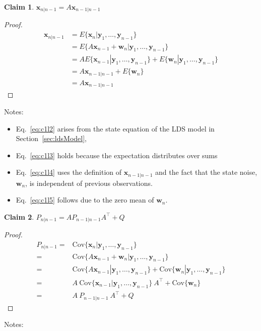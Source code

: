 \documentclass[12pt]{article}
\newtheorem{claim}{Claim}
\begin{document}
\begin{claim}
    $\mathbf{x}_{n|n-1}=A\mathbf{x}_{n-1|n-1}$
    \label{claim:predictionMean}
\end{claim}

\begin{proof}
    \begin{align}
        \mathbf{x}_{n|n-1}&=E\{\mathbf{x}_n|\mathbf{y}_1,\ldots,\mathbf{y}_{n-1}\}\nonumber\\
                          &=E\{A\mathbf{x}_{n-1}+\mathbf{w}_n|\mathbf{y}_1,\ldots,\mathbf{y}_{n-1}\}\label{eq:c1l2}\\
                          &=AE\{\mathbf{x}_{n-1}|\mathbf{y}_ 1,\ldots,\mathbf{y}_{n-1}\}+E\{\mathbf{w}_n|\mathbf{y}_1,\ldots,\mathbf{y}_{n-1}\}\label{eq:c1l3}\\
                          &=A\mathbf{x}_{n-1|n-1}+E\{\mathbf{w}_n\}\label{eq:c1l4}\\
                          &=A\mathbf{x}_{n-1|n-1\label{eq:c1l5}}
    \end{align}
\end{proof}

Notes:

\begin{itemize}

    \item Eq.~\ref{eq:c1l2} arises from the state equation of the LDS model in
        Section~\ref{sec:ldsModel},
    \item Eq.~\ref{eq:c1l3} holds because the expectation distributes over sums
    \item Eq.~\ref{eq:c1l4} uses the definition of $\mathbf{x}_{n-1|n-1}$ and
        the fact that the state noise, $\mathbf{w}_n$, is independent of previous observations.
    \item Eq.~\ref{eq:c1l5} follows due to the zero mean of $\mathbf{w}_n$.
\end{itemize}

\begin{claim}
    $P_{n|n-1}=AP_{n-1|n-1}A^\intercal+Q$
    \label{claim:predictionCov}
\end{claim}

\begin{proof}
    \begin{align}
        P_{n|n-1}=&\text{Cov}\{\mathbf{x}_n|\mathbf{y}_1,\ldots,\mathbf{y}_{n-1}\}\nonumber\\
                 =&\text{Cov}\{A\mathbf{x}_{n-1}+\mathbf{w}_n|\mathbf{y}_1,\ldots,\mathbf{y}_{n-1}\}\label{eq:c2l2}\\
                 =&\text{Cov}\{A\mathbf{x}_{n-1}|\mathbf{y}_1,\ldots,\mathbf{y}_{n-1}\}+\text{Cov}\{\mathbf{w}_n|\mathbf{y}_1,\ldots,\mathbf{y}_{n-1}\}\label{eq:c2l3}\\
                 =&A\ \text{Cov}\{\mathbf{x}_{n-1}|\mathbf{y}_1,\ldots,\mathbf{y}_{n-1}\}\ A^\intercal+\text{Cov}\{\mathbf{w}_n\}\label{eq:c2l4}\\
                 =&A\ P_{n-1|n-1}\ A^\intercal+Q\label{eq:c2l5}
    \end{align}
\end{proof}
Notes:
\end{document}
